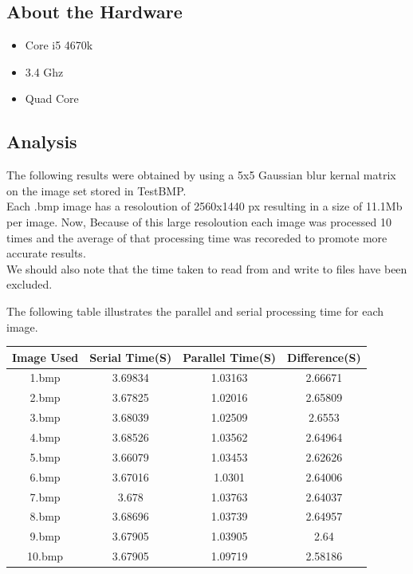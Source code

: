 \documentclass[paper=a4, fontsize=11pt]{scrartcl} %
\numberwithin{equation}{section} %
\numberwithin{figure}{section} %
\numberwithin{table}{section} %
\begin{document}
\subsection{About the Hardware}

\begin{itemize}
\item{Core i5 4670k \\}
\item{3.4 Ghz \\}
\item{Quad Core \\}
\end{itemize}




\subsection{Analysis}
The following results were obtained by using a 5x5 Gaussian blur kernal matrix on the image set stored in TestBMP.\\
Each .bmp image has a resoloution of 2560x1440 px resulting in a size of 11.1Mb per image. Now, Because of this large resoloution each image was processed 10 times and the average of that processing time was recoreded to promote more accurate results.\\


We should also note that the time taken to read from and write to files have been excluded.

The following table illustrates the parallel and serial processing time for each image.\\

\begin{center}

\begin{tabular}{||c |c |c |c ||}
\hline
\textbf{Image Used} & \textbf{Serial Time(S)} & \textbf{Parallel Time(S)} & \textbf{Difference(S)} \\[0.5ex]
\hline \hline

1.bmp & 3.69834 & 1.03163 & 2.66671 \\
2.bmp & 3.67825 & 1.02016 & 2.65809\\
3.bmp & 3.68039 & 1.02509 & 2.6553\\
4.bmp & 3.68526 & 1.03562 & 2.64964\\
5.bmp & 3.66079 & 1.03453 & 2.62626\\
6.bmp & 3.67016 & 1.0301 & 2.64006\\
7.bmp & 3.678 & 1.03763 & 2.64037\\
8.bmp & 3.68696 & 1.03739  & 2.64957\\
9.bmp & 3.67905 & 1.03905 & 2.64\\
10.bmp & 3.67905 & 1.09719 & 2.58186\\[1ex]

\hline

\end{tabular}

\end{center}
\end{document}
